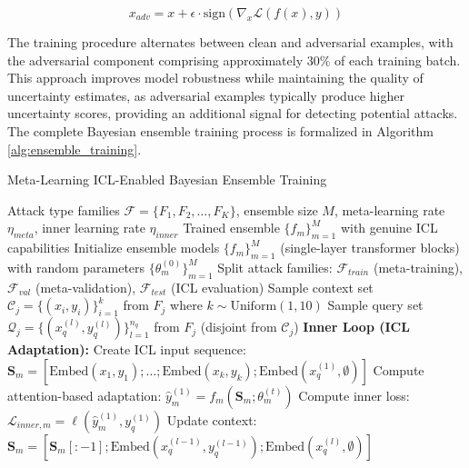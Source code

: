 \documentclass[journal]{IEEEtran}
\begin{document}
\begin{equation}
x_{adv} = x + \epsilon \cdot \text{sign}(\nabla_x \mathcal{L}(f(x), y))
\end{equation}

The training procedure alternates between clean and adversarial examples, with the adversarial component comprising approximately 30\% of each training batch. This approach improves model robustness while maintaining the quality of uncertainty estimates, as adversarial examples typically produce higher uncertainty scores, providing an additional signal for detecting potential attacks. The complete Bayesian ensemble training process is formalized in Algorithm \ref{alg:ensemble_training}.

\begin{algorithm}[t]
\caption{Meta-Learning ICL-Enabled Bayesian Ensemble Training}
\label{alg:ensemble_training}
\begin{algorithmic}[1]
\REQUIRE Attack type families $\mathcal{F} = \{F_1, F_2, \ldots, F_K\}$, ensemble size $M$, meta-learning rate $\eta_{meta}$, inner learning rate $\eta_{inner}$
\ENSURE Trained ensemble $\{f_m\}_{m=1}^M$ with genuine ICL capabilities
\STATE Initialize ensemble models $\{f_m\}_{m=1}^M$ (single-layer transformer blocks) with random parameters $\{\theta_m^{(0)}\}_{m=1}^M$
\STATE Split attack families: $\mathcal{F}_{train}$ (meta-training), $\mathcal{F}_{val}$ (meta-validation), $\mathcal{F}_{test}$ (ICL evaluation)
            \STATE Sample context set $\mathcal{C}_j = \{(x_i, y_i)\}_{i=1}^{k}$ from $F_j$ where $k \sim \text{Uniform}(1, 10)$ 
            \STATE Sample query set $\mathcal{Q}_j = \{(x_q^{(l)}, y_q^{(l)})\}_{l=1}^{n_q}$ from $F_j$ (disjoint from $\mathcal{C}_j$)
                \STATE \textbf{Inner Loop (ICL Adaptation):}
                \STATE Create ICL input sequence: $\mathbf{S}_m = [\text{Embed}(x_1, y_1); \ldots; \text{Embed}(x_k, y_k); \text{Embed}(x_q^{(1)}, \emptyset)]$
                \STATE Compute attention-based adaptation: $\hat{y}_m^{(1)} = f_m(\mathbf{S}_m; \theta_m^{(t)})$ 
                \STATE Compute inner loss: $\mathcal{L}_{inner,m} = \ell(\hat{y}_m^{(1)}, y_q^{(1)})$
                    \STATE Update context: $\mathbf{S}_m = [\mathbf{S}_m[:-1]; \text{Embed}(x_q^{(l-1)}, y_q^{(l-1)}); \text{Embed}(x_q^{(l)}, \emptyset)]$ 

\end{algorithmic}
\end{algorithm}
\end{document}
